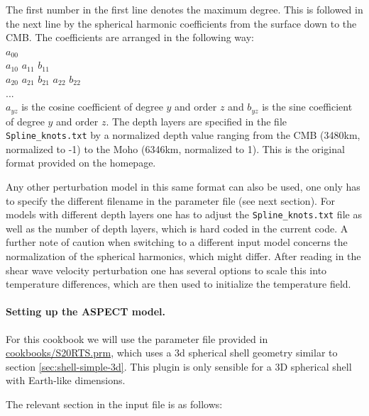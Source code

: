 \documentclass{article}
\newcommand{\aspect}{\textsc{ASPECT}}
\begin{document}


The first number in the first line denotes the maximum degree. This is followed in 
the next line by the spherical harmonic coefficients from the surface down to the 
CMB. The coefficients are arranged in the following way:\\

\noindent $a_{00}$ \\
$a_{10}$ $a_{11}$ $b_{11}$ \\
$a_{20}$ $a_{21}$ $b_{21}$ $a_{22}$ $b_{22}$ \\
... \\

$a_{yz}$ is the cosine coefficient of degree $y$ and order $z$ and $b_{yz}$ is 
the sine coefficient of degree $y$ and order $z$. The depth layers are specified 
in the file \texttt{Spline\_knots.txt} by a normalized depth value ranging from the CMB (3480km, 
normalized to -1) to the Moho (6346km, normalized to 1). This is the original
format provided on the homepage. 

Any other perturbation model in this same format can also be used, one only
has to specify the different filename in the parameter file (see next section).
For models with different depth layers one has to adjust the \texttt{Spline\_knots.txt} 
file as well as the number of depth layers, which is hard coded in the current 
code. A further note of caution when switching to a different input model 
concerns the normalization of the spherical harmonics, which might differ.  
After reading in the shear wave velocity perturbation one has several options
to scale this into temperature differences, which are then used to initialize 
the temperature field. 

\paragraph{Setting up the \aspect{} model.}

For this cookbook we will use the parameter file provided in 
\url{cookbooks/S20RTS.prm}, which uses a 3d spherical shell 
geometry similar to section \ref{sec:shell-simple-3d}. This plugin is only sensible 
for a 3D spherical shell with Earth-like dimensions. 

The relevant section in the input file is as follows:


\end{document}
